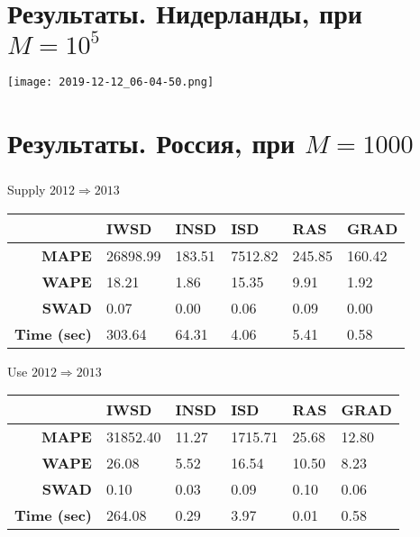 \documentclass{beamer}
\begin{document}
\section{Результаты. Нидерланды, при $M = 10^5$}
\begin{frame}
	\frametitle{\insertsection}
	
	\texttt{[image: 2019-12-12\_06-04-50.png]}
	
\end{frame}

\section{Результаты. Россия, при $M = 1000$}
\begin{frame}
	\frametitle{\insertsection}
	
	\begin{center}
		Supply $2012 \Rightarrow 2013$
		\begin{tabular}{|r|m{1.5cm}|m{1cm}|m{1.2cm}|m{1cm}|m{1cm}|}
			\hline
			& \textbf{IWSD} & \textbf{INSD} & \textbf{ISD} & \textbf{RAS} & \textbf{GRAD} \\
			\hline
			\textbf{MAPE} & 26898.99 & 183.51 & 7512.82 & 245.85 & 160.42 \\
			\textbf{WAPE} & 18.21 & 1.86 & 15.35 & 9.91 & 1.92 \\
			\textbf{SWAD} & 0.07 & 0.00 & 0.06 & 0.09 & 0.00 \\
			\textbf{Time (sec)} & 303.64 & 64.31 & 4.06 & 5.41 & 0.58 \\
			\hline
		\end{tabular}
	\end{center}
	
	\begin{center}
		Use $2012 \Rightarrow 2013$
		\begin{tabular}{|r|m{1.5cm}|m{1cm}|m{1.2cm}|m{1cm}|m{1cm}|}
			\hline
			& \textbf{IWSD} & \textbf{INSD} & \textbf{ISD} & \textbf{RAS} & \textbf{GRAD} \\
			\hline
			\textbf{MAPE} & 31852.40 & 11.27 & 1715.71 & 25.68 & 12.80 \\
			\textbf{WAPE} & 26.08 & 5.52 & 16.54 & 10.50 & 8.23 \\
			\textbf{SWAD} & 0.10 & 0.03 & 0.09 & 0.10 & 0.06 \\
			\textbf{Time (sec)} & 264.08 & 0.29 & 3.97 & 0.01 & 0.58 \\
			\hline
		\end{tabular}
	\end{center}
	
\end{frame}
\end{document}
